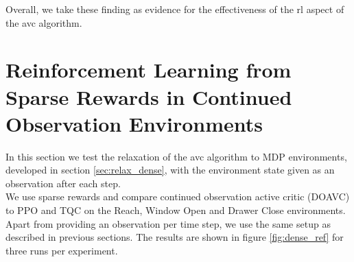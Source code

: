 Overall, we take these finding as evidence for the effectiveness of the \ac{rl} aspect of the \ac{avc} algorithm.


\section{Reinforcement Learning from Sparse Rewards in Continued Observation Environments}
\label{sec_exp_con_obs}
In this section we test the relaxation of the \ac{avc} algorithm to MDP environments, developed in section \ref{sec:relax_dense}, with the environment state given as an observation after each step. \\
We use sparse rewards 
and compare continued observation active critic (DOAVC) to PPO and TQC on the Reach, Window Open and Drawer Close environments. Apart from 
providing an observation per time step,
we use the same setup as described in previous sections. The results are shown in figure \ref{fig:dense_ref} for three runs per experiment.\\ 


